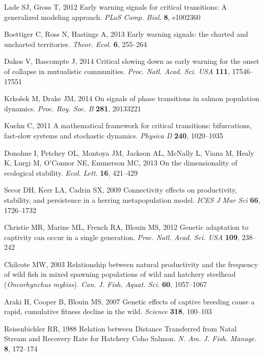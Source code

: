 \documentclass{revtex4}
\begin{document}
\begin{thebibliography}{10}
Lade SJ, Gross T, 2012 {Early warning signals for critical transitions: A
  generalized modeling approach}.
\newblock \emph{PLoS Comp. Biol.} \textbf{8}, e1002360

Boettiger C, Ross N, Hastings A, 2013 {Early warning signals: the charted and
  uncharted territories}.
\newblock \emph{Theor. Ecol.} \textbf{6}, 255--264

Dakos V, Bascompte J, 2014 {Critical slowing down as early warning for the
  onset of collapse in mutualistic communities}.
\newblock \emph{Proc. Natl. Acad. Sci. USA} \textbf{111}, 17546--17551

Krko{\v s}ek M, Drake JM, 2014 {On signals of phase transitions in salmon
  population dynamics}.
\newblock \emph{Proc. Roy. Soc. B} \textbf{281}, 20133221

Kuehn C, 2011 {A mathematical framework for critical transitions: bifurcations,
  fast-slow systems and stochastic dynamics}.
\newblock \emph{Physica D} \textbf{240}, 1020--1035

Donohue I, Petchey OL, Montoya JM, Jackson AL, McNally L, Viana M, Healy K,
  Lurgi M, O'Connor NE, Emmerson MC, 2013 {On the dimensionality of ecological
  stability.}
\newblock \emph{Ecol. Lett.} \textbf{16}, 421--429

Secor DH, Kerr LA, Cadrin SX, 2009 {Connectivity effects on productivity,
  stability, and persistence in a herring metapopulation model}.
\newblock \emph{ICES J Mar Sci} \textbf{66}, 1726--1732

Christie MR, Marine ML, French RA, Blouin MS, 2012 {Genetic adaptation to
  captivity can occur in a single generation.}
\newblock \emph{Proc. Natl. Acad. Sci. USA} \textbf{109}, 238--242

Chilcote MW, 2003 {Relationship between natural productivity and the frequency
  of wild fish in mixed spawning populations of wild and hatchery steelhead
  (\emph{Oncorhynchus mykiss})}.
\newblock \emph{Can. J. Fish. Aquat. Sci.} \textbf{60}, 1057--1067

Araki H, Cooper B, Blouin MS, 2007 {Genetic effects of captive breeding cause a
  rapid, cumulative fitness decline in the wild}.
\newblock \emph{Science} \textbf{318}, 100--103

Reisenbichler RR, 1988 {Relation between Distance Transferred from Natal Stream
  and Recovery Rate for Hatchery Coho Salmon}.
\newblock \emph{N. Am. J. Fish. Manage.} \textbf{8}, 172--174


\end{thebibliography}
\end{document}
